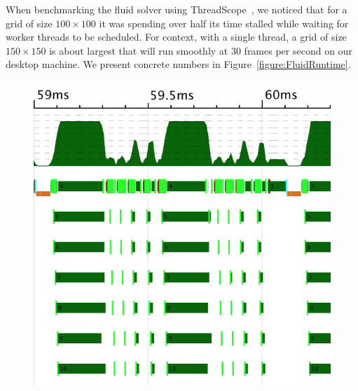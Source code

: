 When benchmarking the fluid solver using ThreadScope~\cite{Jones:ThreadScope}, we noticed that for a grid of size $100 \times 100$ it was spending over half its time stalled while waiting for worker threads to be scheduled. For context, with a single thread, a grid of size $150 \times 150$ is about largest that will run smoothly at 30 frames per second on our desktop machine. We present concrete numbers in Figure~\ref{figure:FluidRuntime}.

\begin{figure}
\begin{center}
\includegraphics[scale=0.2]{data/fluid/par}
\hspace{2em}

\end{center}
\end{figure}
